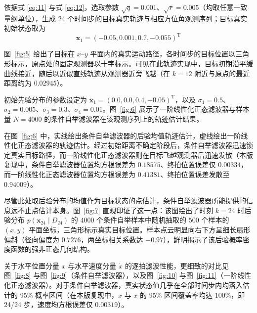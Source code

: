 依据式 \eqref{eq:11} 与式 \eqref{eq:12}，选取参数 $\sqrt{q} = 0.001$、$\sqrt{r} = 0.005$（均取任意一致量纲单位），生成 24 个时间步的目标真实轨迹与相应方位角观测序列；目标真实初始状态取为
\begin{equation*}
\bm{x}_1 = (-0.05, 0.001, 0.7, -0.055)^{\mathrm{T}}
\end{equation*}

图~\ref{fig:5} 给出了目标在 $x\text{--}y$ 平面内的真实运动路径，各时间步的目标位置以三角形标示，原点处的固定观测器以十字标示。可见在此轨迹实现中，目标初期沿平缓曲线接近，随后以近似直线轨迹从观测器近旁飞越（在 $k = 12$ 附近与原点的最近距离约为 $0.02945$）。


初始先验分布的参数设定为 $\bar{\bm{x}}_1 = (0.0, 0.0, 0.4, -0.05)^{\mathrm{T}}$，以及 $\sigma_1 = 0.5$、$\sigma_2 = 0.005$、$\sigma_3 = 0.3$、$\sigma_4 = 0.01$。图~\ref{fig:6} 展示了一阶线性化正态滤波器与样本量 $N = 4000$ 的条件自举滤波器在该观测序列上的轨迹估计结果。


在图~\ref{fig:6} 中，实线绘出条件自举滤波器的后验均值轨迹估计，虚线绘出一阶线性化正态滤波器的轨迹估计。经过初始距离不确定阶段后，条件自举滤波器迅速锁定真实目标路径，而一阶线性化正态滤波器则在目标飞越观测器后迅速发散（本版复现中，条件自举滤波器位置均方根误差为 $0.18575$、终拍位置误差仅 $0.00334$，而一阶线性化正态滤波器位置均方根误差为 $0.41381$、终拍位置误差发散至 $0.94009$）。

尽管此处取后验分布的均值作为目标状态的点估计，条件自举滤波器所能提供的信息远不止点估计本身。图~\ref{fig:7} 直观印证了这一点：该图绘出了时刻 $k = 24$ 时后验分布 $p(\bm{x}_{24} \mid D_{24})$ 的 $4000$ 个条件自举样本中随机抽取的 $500$ 个样本的 $(x, y)$ 平面坐标，三角形标示真实目标位置。样本点云明显向右下方呈细长扇形偏斜（径向偏度为 $0.7276$，两坐标相关系数达 $-0.97$），鲜明揭示了该后验概率密度函数的强非正态几何结构。


关于水平位置分量 $x$ 与水平速度分量 $\dot{x}$ 的逐拍滤波性能，更细致的对比见图~\ref{fig:8} 与图~\ref{fig:9}（条件自举滤波器），以及图~\ref{fig:10} 与图~\ref{fig:11}（一阶线性化正态滤波器）。对于条件自举滤波器，真实状态值几乎在全部时间步内均落入估计的 95\% 概率区间（在本版复现中，$x$ 与 $\dot{x}$ 的 95\% 区间覆盖率均达 $100\%$，即 24/24 步，速度均方根误差仅 $0.00319$）。

